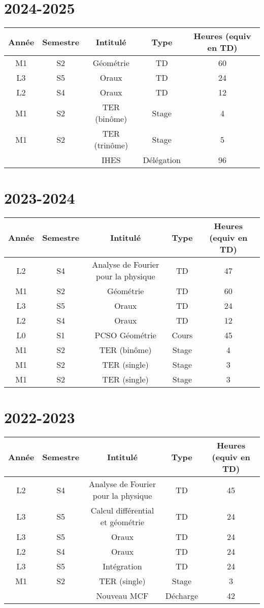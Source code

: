 \documentclass[a4paper, 13pt]{article}
\begin{document}
\section*{2024-2025}
\begin{center}
\begin{tabular}{ |c|c|c|c|c| } 
 \hline
 Année & Semestre & Intitulé & Type & Heures (equiv en TD)\\ \hline
   M1 & S2 & Géométrie & TD & 60\\ 
 L3 & S5 & Oraux & TD & 24\\
  L2 & S4 & Oraux & TD & 12 \\
 M1 & S2 & TER (binôme) & Stage & 4\\
  M1 & S2 & TER (trinôme) & Stage & 5\\
    &  & IHES & Délégation & 96 \\  
   \hline
\end{tabular}
\end{center}
\section*{2023-2024}
\begin{center}
\begin{tabular}{ |c|c|c|c|c| } 
 \hline
 Année & Semestre & Intitulé & Type & Heures (equiv en TD)\\ \hline
 L2 & S4 & Analyse de Fourier pour la physique & TD & 47\\ 
  M1 & S2 & Géométrie & TD & 60\\ 
 L3 & S5 & Oraux & TD & 24\\
  L2 & S4 & Oraux & TD & 12 \\
   L0 & S1 & PCSO Géométrie & Cours & 45\\
    M1 & S2 & TER (binôme) & Stage & 4\\
 M1 & S2 & TER (single) & Stage & 3\\
  M1 & S2 & TER (single) & Stage & 3\\
   \hline
\end{tabular}
\end{center}
\newpage
\section*{2022-2023}
\begin{center}
\begin{tabular}{ |c|c|c|c|c| } 
 \hline
 Année & Semestre & Intitulé & Type & Heures (equiv en TD)\\ \hline
 L2 & S4 & Analyse de Fourier pour la physique & TD & 45\\ 
 L3 & S5 & Calcul différential et géométrie & TD & 24\\
 L3 & S5 & Oraux & TD & 24\\
  L2 & S4 & Oraux & TD & 24 \\
   L3 & S5 & Intégration & TD & 24\\
 M1 & S2 & TER (single) & Stage & 3\\
  &  & Nouveau MCF & Décharge & 42 \\  
   \hline
\end{tabular}
\end{center}
\end{document}

